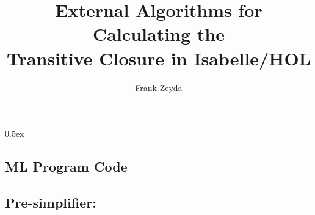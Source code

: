 \documentclass[11pt,a4paper]{article}
\begin{document}

\title{External Algorithms for Calculating the\\Transitive Closure in Isabelle/HOL}

\author{Frank Zeyda\\[+3pt]}

\maketitle

\tableofcontents



\parindent 0pt\parskip 0.5ex



\newpage



\newpage


\subsection{ML Program Code}

\lstset{style=mystyle,language=ML}


\subsection*{Pre-simplifier:~}


\end{document}
